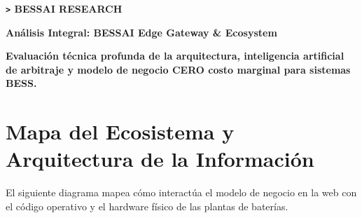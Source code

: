 \documentclass[11pt,a4paper]{article}
\begin{document}
\begin{tcolorbox}[colback=accentorange,colframe=accentorange,arc=0mm,boxrule=0mm,top=10mm,bottom=10mm]
\color{black}
{\small\bfseries \texttt{>} BESSAI RESEARCH}\par\vspace{5mm}
{\Huge\bfseries Análisis Integral: BESSAI Edge Gateway \& Ecosystem}\par\vspace{5mm}
{\large\bfseries Evaluación técnica profunda de la arquitectura, inteligencia artificial de arbitraje y modelo de negocio CERO costo marginal para sistemas BESS.}
\end{tcolorbox}

\vspace{0.5cm}

\section{Mapa del Ecosistema y Arquitectura de la Información}
El siguiente diagrama mapea cómo interactúa el modelo de negocio en la web con el código operativo y el hardware físico de las plantas de baterías.
\end{document}
